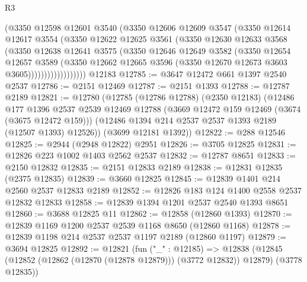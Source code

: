 \begin{lexlean}{R3}
\begin{coremodule}
                    (@3350
                      @12598
                      @12601
                      @3540
                      (@3350
                        @12606
                        @12609
                        @3547
                        (@3350
                          @12614
                          @12617
                          @3554
                          (@3350
                            @12622
                            @12625
                            @3561
                            (@3350
                              @12630
                              @12633
                              @3568
                              (@3350
                                @12638
                                @12641
                                @3575
                                (@3350
                                  @12646
                                  @12649
                                  @3582
                                  (@3350
                                    @12654
                                    @12657
                                    @3589
                                    (@3350
                                      @12662
                                      @12665
                                      @3596
                                      (@3350 @12670 @12673 @3603 @3605))))))))))))))))))
    @12183
@12785 := @3647 @12472 @661 @1397 @2540 @2537
@12786 := @2151 @12469
@12787 := @2151 @1393
@12788 := @12787 @2189
@12821 := @12780
    (@12785
      (@12786 @12788)
      (@2350 @12183)
      (@12486
        @177
        @1396
        @2537
        @2539
        @12469
        @12788
        (@3669 @12472 @159 @12469 (@3674 (@3675 @12472 @159)))
        (@12486 @1394 @214 @2537 @2537 @1393 @2189 (@12507 @1393) @12526))
      (@3699 @12181 @1392))
@12822 := @288 @12546
@12825 := @2944 (@2948 @12822) @2951
@12826 := @3705 @12825
@12831 := @12826 @223 @1002 @1403 @2562 @2537
@12832 := @12787 @8651
@12833 := @2150 @12832
@12835 := @2151 @12833 @2189
@12838 := @12831 @12835 (@2375 @12835)
@12839 := @3660 @12825
@12845 := @12839 @1401 @214 @2560 @2537 @12833 @2189
@12852 := @12826 @183 @124 @1400 @2558 @2537 @12832 @12833
@12858 := @12839 @1394 @1201 @2537 @2540 @1393 @8651
@12860 := @3688 @12825 @11
@12862 := @12858 (@12860 @1393)
@12870 := @12839 @1169 @1200 @2537 @2539 @1168 @8650 (@12860 @1168)
@12878 := @12839 @1198 @214 @2537 @2537 @1197 @2189 (@12860 @1197)
@12879 := @3694 @12825
@12892 := @12821
    (fun ("_" : @12185) =>
    @12838 (@12845 (@12852 (@12862 (@12870 (@12878 @12879))) (@3772 @12832)) @12879) (@3778 @12835))

\end{coremodule}
\end{lexlean}
